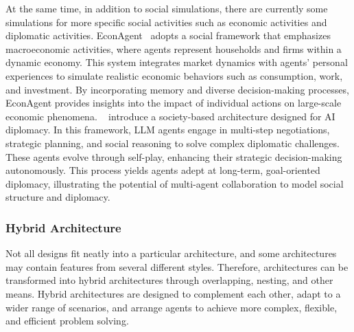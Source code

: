 At the same time, in addition to social simulations, there are currently some simulations for more specific social activities such as economic activities and diplomatic activities. EconAgent~\cite{econagent} adopts a social framework that emphasizes macroeconomic activities, where agents represent households and firms within a dynamic economy. This system integrates market dynamics with agents' personal experiences to simulate realistic economic behaviors such as consumption, work, and investment. By incorporating memory and diverse decision-making processes, EconAgent provides insights into the impact of individual actions on large-scale economic phenomena.
~\cite{richeliey_diplomacy_society} introduce a society-based architecture designed for AI diplomacy. In this framework, LLM agents engage in multi-step negotiations, strategic planning, and social reasoning to solve complex diplomatic challenges. These agents evolve through self-play, enhancing their strategic decision-making autonomously. This process yields agents adept at long-term, goal-oriented diplomacy, illustrating the potential of multi-agent collaboration to model social structure and diplomacy.

\subsubsection{Hybrid Architecture}

Not all designs fit neatly into a particular architecture, and some architectures may contain features from several different styles. Therefore, architectures can be transformed into hybrid architectures through overlapping, nesting, and other means. Hybrid architectures are designed to complement each other, adapt to a wider range of scenarios, and arrange agents to achieve more complex, flexible, and efficient problem solving.

